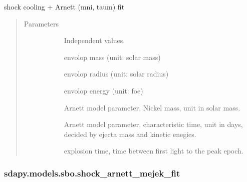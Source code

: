 \documentclass[letterpaper,10pt,english]{sphinxmanual}
\begin{document}
\begin{fulllineitems}
\label{\detokenize{generated/sdapy.models.sbo.shock_arnett_fit:sdapy.models.sbo.shock_arnett_fit}}
shock cooling + Arnett (mni, taum) fit
\begin{quote}\begin{description}
\item[{Parameters}] \leavevmode\begin{description}
\item[{}] \leavevmode{[}\sphinxtitleref{array}{]}
Independent values.

\item[{}] \leavevmode{[}\sphinxtitleref{float}{]}
envolop mass (unit: solar mass)

\item[{}] \leavevmode{[}\sphinxtitleref{float}{]}
envolop radius (unit: solar radius)

\item[{}] \leavevmode{[}\sphinxtitleref{float}{]}
envolop energy (unit: foe)

\item[{}] \leavevmode{[}\sphinxtitleref{float}{]}
Arnett model parameter, Nickel mass, unit in solar mass.

\item[{}] \leavevmode{[}\sphinxtitleref{float}{]}
Arnett model parameter, characteristic time, unit in days, decided by ejecta mass and kinetic enegies.

\item[{}] \leavevmode{[}\sphinxtitleref{float}{]}
explosion time, time between first light to the peak epoch.

\end{description}

\end{description}\end{quote}

\end{fulllineitems}



\subsubsection{sdapy.models.sbo.shock\_arnett\_mejek\_fit}
\label{\detokenize{generated/sdapy.models.sbo.shock_arnett_mejek_fit:sdapy-models-sbo-shock-arnett-mejek-fit}}\label{\detokenize{generated/sdapy.models.sbo.shock_arnett_mejek_fit::doc}}
\end{document}
